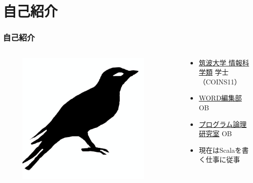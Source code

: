 





\newcommand\ballref[1]{%
\tikz \node[circle, shade,ball color=structure.fg,inner sep=0pt,%
  text width=8pt,font=\tiny,align=center] {\color{white}\ref{#1}};
}




\frame{\maketitle}

\section{自己紹介}
\begin{frame}[fragile]
  \frametitle{自己紹介}
  
  \begin{columns}
    \begin{column}{0.4\textwidth}
      \centering
      \begin{figure}
        \includegraphics[width=0.9\textwidth]{img/bird2x.png}
      \end{figure}
    \end{column}
    \begin{column}{0.6\textwidth}
      \begin{itemize}
        \item<2-> \href{https://www.coins.tsukuba.ac.jp/}{筑波大学 情報科学類} 学士（COINS11）
        \item<3-> \href{http://www.word-ac.net/}{WORD編集部} OB
        \item<4-> \href{http://logic.cs.tsukuba.ac.jp/index-j.html}{プログラム論理研究室} OB
        \item<5-> 現在はScalaを書く仕事に従事
      \end{itemize}
    \end{column}
  \end{columns}
\end{frame}

